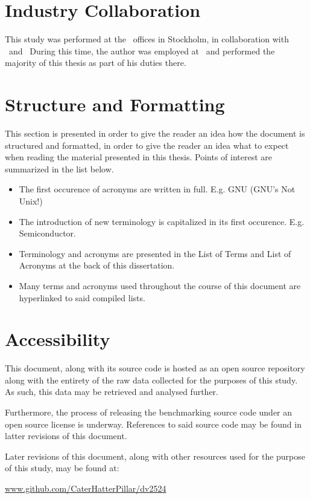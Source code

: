 \section*{Industry Collaboration}
\label{sec:preface_industrycollaboration}
This study was performed at the \dvttermintel\ offices in Stockholm, in collaboration with \dvttermintel\ and \dvttermwindriver\
During this time, the author was employed at \dvttermintel\ and performed the majority of this thesis as part of his duties there.

\section*{Structure and Formatting}
\label{sec:preface_structureandformatting}
This section is presented in order to give the reader an idea how the document is structured and formatted, in order to give the reader an idea what to expect when reading the material presented in this thesis.
Points of interest are summarized in the list below.
\begin{itemize}[noitemsep]
	\item The first occurence of acronyms are written in full. E.g. GNU (GNU's Not Unix!)
	\item The introduction of new terminology is capitalized in its first occurence. E.g. Semiconductor.
	\item Terminology and acronyms are presented in the List of Terms and List of Acronyms at the back of this dissertation.
	\item Many terms and acronyms used throughout the course of this document are hyperlinked to said compiled lists.
\end{itemize}

\section*{Accessibility}
\label{sec:preface_accessibility}
This document, along with its source code is hosted as an open source repository along with the entirety of the raw data collected for the purposes of this study.
As such, this data may be retrieved and analysed further.

Furthermore, the process of releasing the benchmarking source code under an open source license is underway.
References to said source code may be found in latter revisions of this document.

Later revisions of this document, along with other resources used for the purpose of this study, may be found at:
\begin{center}
\href{https://github.com/CaterHatterPillar/dv2524}{www.github.com/CaterHatterPillar/dv2524}
\end{center}

